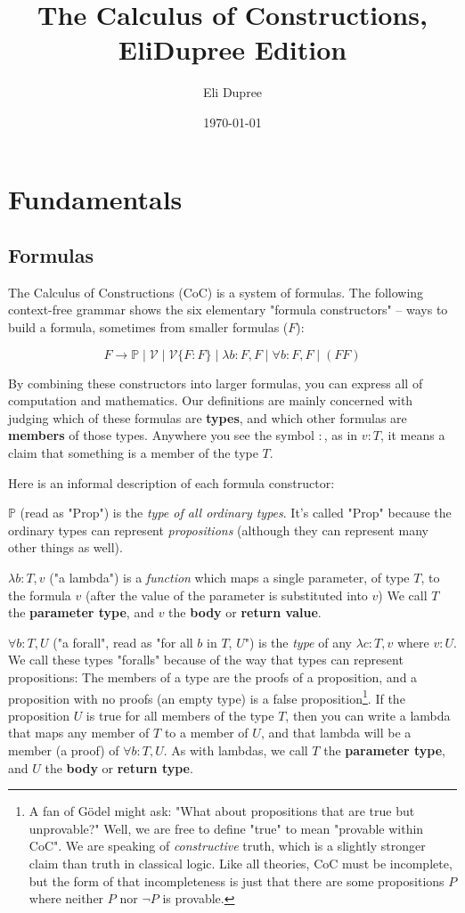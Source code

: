 \documentclass{article}
\title{The Calculus of Constructions, EliDupree Edition}
\author{Eli Dupree}
\date{\today}
\newcommand{\Prop}{\mathbb{P}}
\newcommand{\usage}{\mathcal{V}}
\newcommand{\usageKnown}[2]{\usage\{#2:#1\}}
\begin{document}
  \maketitle

  \section{Fundamentals}
  \subsection{Formulas}

  The Calculus of Constructions (CoC) is a system of formulas. The following context-free grammar shows the six elementary "formula constructors" – ways to build a formula, sometimes from smaller formulas ($F$):

  \[ F \rightarrow \Prop \mid \usage \mid \usageKnown{F}{F} \mid \lambda b:F,F \mid \forall b:F,F \mid (F F) \]
  
  By combining these constructors into larger formulas, you can express all of computation and mathematics. Our definitions are mainly concerned with judging which of these formulas are \textbf{types}, and which other formulas are \textbf{members} of those types. Anywhere you see the symbol $:$, as in $v : T$, it means a claim that something is a member of the type $T$.

  Here is an informal description of each formula constructor:

  $\Prop$ (read as "Prop") is the \emph{type of all ordinary types}. It's called "Prop" because the ordinary types can represent \emph{propositions} (although they can represent many other things as well).
  
  $\lambda b:T,v$ ("a lambda") is a \emph{function} which maps a single parameter, of type $T$, to the formula $v$ (after the value of the parameter is substituted into $v$) We call $T$ the \textbf{parameter type}, and $v$ the \textbf{body} or \textbf{return value}.
  
  $\forall b:T,U$ ("a forall", read as "for all $b$ in $T$, $U$") is the \emph{type} of any $\lambda c:T,v$ where $v : U$. We call these types "foralls" because of the way that types can represent propositions: The members of a type are the proofs of a proposition, and a proposition with no proofs (an empty type) is a false proposition\footnote{A fan of Gödel might ask: "What about propositions that are true but unprovable?" Well, we are free to define "true" to mean "provable within CoC". We are speaking of \emph{constructive} truth, which is a slightly stronger claim than truth in classical logic. Like all theories, CoC must be incomplete, but the form of that incompleteness is just that there are some propositions $P$ where neither $P$ nor $\neg P$ is provable.}. If the proposition $U$ is true for all members of the type $T$, then you can write a lambda that maps any member of $T$ to a member of $U$, and that lambda will be a member (a proof) of $\forall b:T,U$. As with lambdas, we call $T$ the \textbf{parameter type}, and $U$ the \textbf{body} or \textbf{return type}.
  
\end{document}
